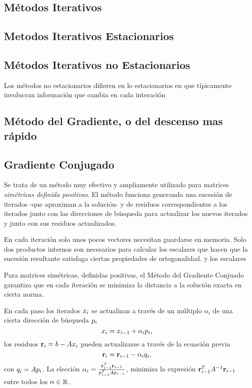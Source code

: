 \begin{tcolorbox}






\chapter{Métodos Iterativos}
\section{Metodos Iterativos Estacionarios}

\section{M\'etodos Iterativos no Estacionarios}
Los métodos no estacionarios difieren en lo estacionarios en que típicamente involucran información que cambia en cada interación
\section{Método del Gradiente, o del descenso mas rápido}

\section{Gradiente Conjugado}
Se trata de un método muy efectivo y ampliamente utilizado para matrices \emph{simétricas definida positivas}. El método funciona generando una sucesión de iterados -que aproximan a la solución- y de residuos correspondientes a los iterados junto con las direcciones de búsqueda para actualizar los nuevos iterados y junto con sus residuos actualizados.

En cada iteración solo unos pocos vectores necesitan guardarse en memoria. Solo dos productos internos son necesarios para calcular los escalares que hacen que la sucesión resultante satisfaga ciertas propiedades de ortogonalidad. y los escalares

\tcc
Para matrices simétricas, definidas positivas, el Método del Gradiente Conjuado garantiza que en cada iteración se minimiza la distancia a la solución exacta en cierta norma.
\etcc

En cada paso los iterados $\xb_i$ se actualizan a través de un múltiplo $\alpha_i$ de una cierta dirección de  búsqueda $\pb_i$
$$
\xb_i=\xb_{i-1}+\alpha_i\pb_i,
$$
los residuos $\rb_i=\bb-\Ab\xb_i$ pueden actualizarse a través de la ecuación previa
$$
\rb_i=\rb_{i-1}-\alpha_i\qb_i,
$$
con $\qb_i=\Ab\pb_i$.
La elección $\alpha_i=\frac{\rb_{i-1}^T\rb_{i-1}}{\pb_{i-1}^T\Ab\pb_{i-1}}$,
minimiza la expresión $\rb_{i-1}^T\Ab^{-1}\rb_{i-1}$ entre todos los
$\alpha\in \mathbb R$.


\end{tcolorbox}

